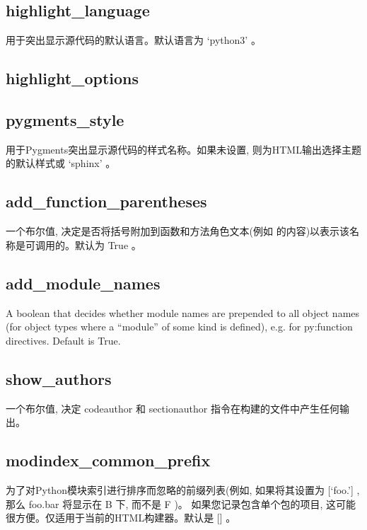 \documentclass[a4paper,10pt,english]{sphinxmanual}
\begin{document}
\subsection{highlight\_language}
\label{\detokenize{sphinx_conf:highlight-language}}
\sphinxAtStartPar
用于突出显示源代码的默认语言。默认语言为 ‘python3’ 。


\subsection{highlight\_options}
\label{\detokenize{sphinx_conf:highlight-options}}
\sphinxAtStartPar
{}


\subsection{pygments\_style}
\label{\detokenize{sphinx_conf:pygments-style}}
\sphinxAtStartPar
用于Pygments突出显示源代码的样式名称。如果未设置, 则为HTML输出选择主题的默认样式或 ‘sphinx’ 。


\subsection{add\_function\_parentheses}
\label{\detokenize{sphinx_conf:add-function-parentheses}}
\sphinxAtStartPar
一个布尔值, 决定是否将括号附加到函数和方法角色文本(例如  的内容)以表示该名称是可调用的。默认为 True 。


\subsection{add\_module\_names}
\label{\detokenize{sphinx_conf:add-module-names}}
\sphinxAtStartPar
A boolean that decides whether module names are prepended to all object names
(for object types where a “module” of some kind is defined), e.g. for py:function directives. Default is True.


\subsection{show\_authors}
\label{\detokenize{sphinx_conf:show-authors}}
\sphinxAtStartPar
一个布尔值, 决定 codeauthor 和 sectionauthor 指令在构建的文件中产生任何输出。


\subsection{modindex\_common\_prefix}
\label{\detokenize{sphinx_conf:modindex-common-prefix}}
\sphinxAtStartPar
为了对Python模块索引进行排序而忽略的前缀列表(例如, 如果将其设置为 {[}‘foo.’{]} , 那么 foo.bar 将显示在 B 下, 而不是 F )。
如果您记录包含单个包的项目, 这可能很方便。仅适用于当前的HTML构建器。默认是 {[}{]} 。
\end{document}
